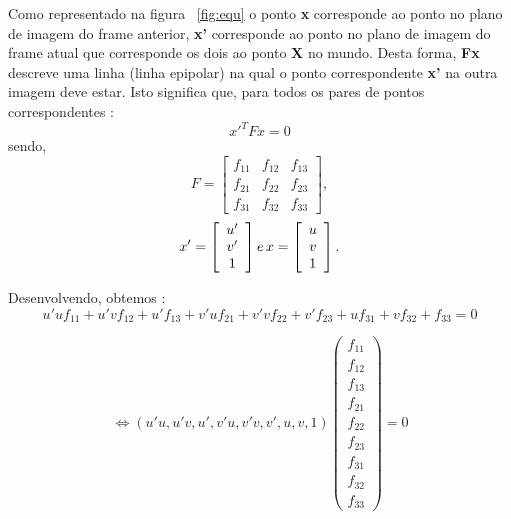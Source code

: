 	Como representado na figura ~\ref{fig:equ} o ponto \textbf{x} corresponde ao ponto no plano de imagem do frame anterior, \textbf{x'} corresponde ao ponto no plano de imagem do frame atual que corresponde os dois ao ponto \textbf{X} no mundo. Desta forma, \textbf{Fx} descreve uma linha (linha epipolar) na qual o ponto correspondente \textbf{x'} na outra imagem deve estar. Isto significa que, para todos os pares de pontos correspondentes : \[ {x}'^{T} F x = 0 \] 
	sendo, \[ F =  \left[ \begin{array}{ccc}
	f_{11} & f_{12} & f_{13} \\ 
	f_{21} & f_{22} & f_{23} \\ 
	f_{31} & f_{32} & f_{33} 
	\end{array}\right], \] \[ {x}' = \left[ \begin{array}{ccc}
	{u}' \\ {v}'\\ 1 
	\end{array} \right] e  \thinspace x = \left[ \begin{array}{ccc}
		u \\ v \\ 1  \end{array}\right]  . \]
		
	Desenvolvendo, obtemos : \[ u'uf_{11} + u'vf_{12} + u'f_{13} + v'uf_{21} + v'vf_{22} + v'f_{23} + uf_{31} + vf_{32} + f_{33} = 0 \]
	
	\[	\Leftrightarrow (u'u , u'v , u' , v'u , v'v , v' , u , v , 1) \left( \begin{array}{ccccccccc}
		f_{11}\\
		f_{12}\\
		f_{13}\\
		f_{21}\\
		f_{22}\\
		f_{23}\\
		f_{31}\\
		f_{32}\\
		f_{33}
		\end{array} \right) = 0 \] 
	
